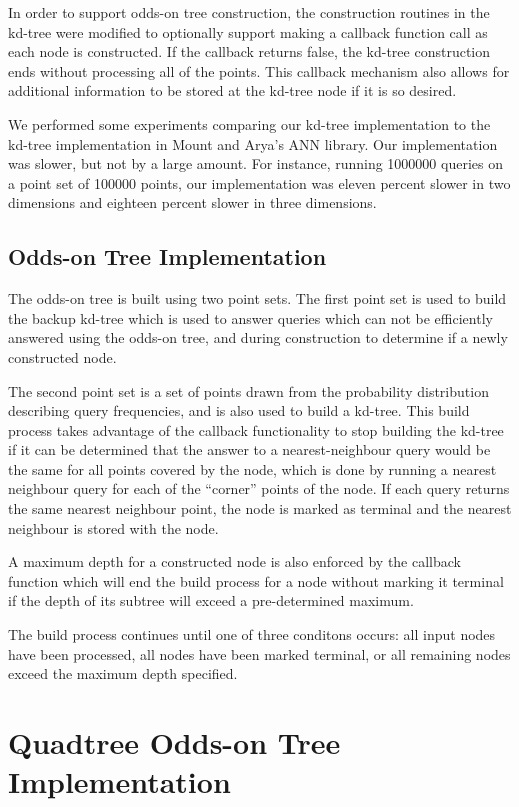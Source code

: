 \documentclass[mcs]{scsthesis}
\begin{document}
In order to support odds-on tree construction, the construction routines in
the kd-tree were modified to optionally support making a callback function
call as each node is constructed. If the callback returns false, the kd-tree
construction ends without processing all of the points. This callback
mechanism also allows for additional information to be stored at the kd-tree
node if it is so desired.

We performed some experiments comparing our kd-tree implementation to the 
kd-tree implementation in Mount and Arya's ANN library\cite{ann}. Our
implementation was slower, but not by a large amount. For instance, running
1000000 queries on a point set of 100000 points, our implementation was eleven
percent slower in two dimensions and eighteen percent slower in three
dimensions.

\subsection{Odds-on Tree Implementation}

The odds-on tree is built using two point sets. The first point set is used
to build the backup kd-tree which is used to answer queries which can not be
efficiently answered using the odds-on tree, and during construction to
determine if a newly constructed node.

The second point set is a set of points drawn from the probability distribution
describing query frequencies, and is also used to build a kd-tree. This build
process takes advantage of the callback functionality to stop building the
kd-tree if it can be determined that the answer to a nearest-neighbour query
would be the same for all points covered by the node, which is done by
running a nearest neighbour query for each of the ``corner'' points of the node.
If each query returns the same nearest neighbour point, the node is marked
as terminal and the nearest neighbour is stored with the node.

A maximum depth for a constructed node is also enforced by the callback
function which will end the build process for a node without marking it
terminal if the depth of its subtree will exceed a pre-determined maximum.

The build process continues until one of three conditons occurs: all input nodes
have been processed, all nodes have been marked terminal, or all remaining nodes
exceed the maximum depth specified.

\section{Quadtree Odds-on Tree Implementation}
\end{document}

